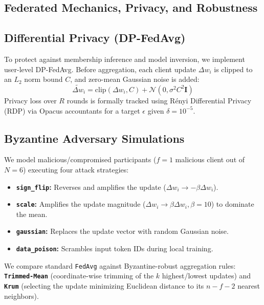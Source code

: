 \documentclass[11pt,a4paper]{article}
\begin{document}
\subsection{Federated Mechanics, Privacy, and Robustness}

\subsection{Differential Privacy (DP-FedAvg)}
To protect against membership inference and model inversion, we implement user-level DP-FedAvg. Before aggregation, each client update $\Delta w_i$ is clipped to an $L_2$ norm bound $C$, and zero-mean Gaussian noise is added:
\begin{equation}
    \tilde{\Delta w}_i = \text{clip}(\Delta w_i, C) + \mathcal{N}\left(0, \sigma^2 C^2 \mathbf{I}\right)
\end{equation}
Privacy loss over $R$ rounds is formally tracked using Rényi Differential Privacy (RDP) via Opacus accountants for a target $\epsilon$ given $\delta = 10^{-5}$.

\subsection{Byzantine Adversary Simulations}
We model malicious/compromised participants ($f = 1$ malicious client out of $N = 6$) executing four attack strategies:
\begin{itemize}
    \item \textbf{\texttt{sign\_flip}:} Reverses and amplifies the update ($\Delta w_i \to - \beta \Delta w_i$).
    \item \textbf{\texttt{scale}:} Amplifies the update magnitude ($\Delta w_i \to \beta \Delta w_i, \beta=10$) to dominate the mean.
    \item \textbf{\texttt{gaussian}:} Replaces the update vector with random Gaussian noise.
    \item \textbf{\texttt{data\_poison}:} Scrambles input token IDs during local training.
\end{itemize}
We compare standard \texttt{FedAvg} against Byzantine-robust aggregation rules: \textbf{\texttt{Trimmed-Mean}} (coordinate-wise trimming of the $k$ highest/lowest updates) and \textbf{\texttt{Krum}} (selecting the update minimizing Euclidean distance to its $n-f-2$ nearest neighbors).
\end{document}

